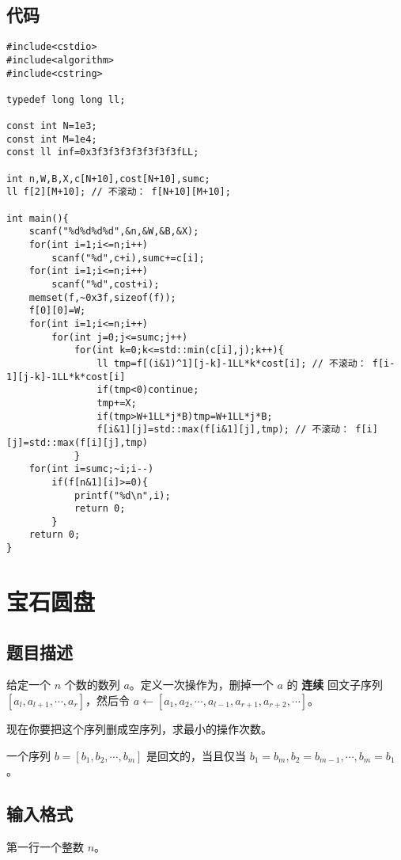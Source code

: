 \documentclass{article}
\begin{document}
	\subsection{代码}

	\begin{lstlisting}
#include<cstdio>
#include<algorithm>
#include<cstring>

typedef long long ll;

const int N=1e3;
const int M=1e4;
const ll inf=0x3f3f3f3f3f3f3f3fLL;

int n,W,B,X,c[N+10],cost[N+10],sumc;
ll f[2][M+10]; // 不滚动： f[N+10][M+10];

int main(){
	scanf("%d%d%d%d",&n,&W,&B,&X);
	for(int i=1;i<=n;i++)
		scanf("%d",c+i),sumc+=c[i];
	for(int i=1;i<=n;i++)
		scanf("%d",cost+i);
	memset(f,~0x3f,sizeof(f));
	f[0][0]=W;
	for(int i=1;i<=n;i++)
		for(int j=0;j<=sumc;j++)
			for(int k=0;k<=std::min(c[i],j);k++){
				ll tmp=f[(i&1)^1][j-k]-1LL*k*cost[i]; // 不滚动： f[i-1][j-k]-1LL*k*cost[i]
				if(tmp<0)continue;
				tmp+=X;
				if(tmp>W+1LL*j*B)tmp=W+1LL*j*B;
				f[i&1][j]=std::max(f[i&1][j],tmp); // 不滚动： f[i][j]=std::max(f[i][j],tmp)
			}
	for(int i=sumc;~i;i--)
		if(f[n&1][i]>=0){
			printf("%d\n",i);
			return 0;
		}
	return 0;
}
	\end{lstlisting}

	\newpage
	
	\section{宝石圆盘}

	\subsection{题目描述}

	给定一个 $n$ 个数的数列 $a$。定义一次操作为，删掉一个 $a$ 的 \textbf{连续} 回文子序列 $[a_l,a_{l+1},\cdots,a_r]$，然后令 $a\gets [a_1,a_2,\cdots,a_{l-1},a_{r+1},a_{r+2},\cdots]$。

	现在你要把这个序列删成空序列，求最小的操作次数。

	一个序列 $b=[b_1,b_2,\cdots,b_m]$ 是回文的，当且仅当 $b_1=b_m,b_2=b_{m-1},\cdots,b_m=b_1$。

	\subsection{输入格式}

	第一行一个整数 $n$。
\end{document}
